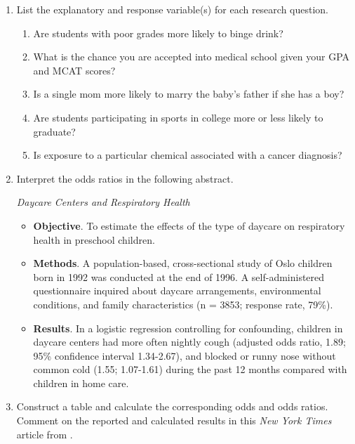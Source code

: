 \documentclass[
]{krantz}
\providecommand{\tightlist}{%
  \setlength{\itemsep}{0pt}\setlength{\parskip}{0pt}}
\begin{document}
\begin{enumerate}
\def\labelenumi{\arabic{enumi}.}
\item
  List the explanatory and response variable(s) for each research question.

  \begin{enumerate}
  \def\labelenumii{\alph{enumii}.}
  \tightlist
  \item
    Are students with poor grades more likely to binge drink?
  \item
    What is the chance you are accepted into medical school given your GPA and MCAT scores?
  \item
    Is a single mom more likely to marry the baby's father if she has a boy?
  \item
    Are students participating in sports in college more or less likely to graduate?
  \item
    Is exposure to a particular chemical associated with a cancer diagnosis?
  \end{enumerate}
\item
  Interpret the odds ratios in the following abstract.

  \emph{Daycare Centers and Respiratory Health} \citep{Nafstad1999}

  \begin{itemize}
  \item
    \textbf{Objective}. To estimate the effects of the type of daycare on respiratory health in preschool children.
  \item
    \textbf{Methods}. A population-based, cross-sectional study of Oslo children born in 1992 was conducted at the end of 1996. A self-administered questionnaire inquired about daycare arrangements, environmental conditions, and family characteristics (n = 3853; response rate, 79\%).
  \item
    \textbf{Results}. In a logistic regression controlling for confounding, children in daycare centers had more often nightly cough (adjusted odds ratio, 1.89; 95\% confidence interval 1.34-2.67), and blocked or runny nose without common cold (1.55; 1.07-1.61) during the past 12 months compared with children in home care.
  \end{itemize}
\item
  Construct a table and calculate the corresponding odds and odds ratios. Comment on the reported and calculated results in this \emph{New York Times} article from \citet{Kolata2009}.


\end{enumerate}
\end{document}
